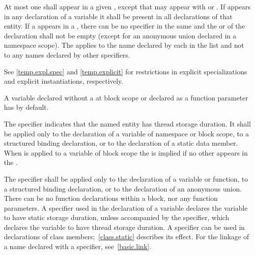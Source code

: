 At most one  shall appear in a given
, except that  may appear with  or
. If  appears in any declaration of
a variable it shall be present in all declarations of that entity. If a
appears in a , there can be no
 specifier in the same  and
the  or 
of the declaration shall not be
empty (except for an anonymous union declared in a namespace scope). The
 applies to the name declared by each
 in the list and not to any names declared by
other specifiers.
\begin{note}
See \ref{temp.expl.spec} and \ref{temp.explicit} for restrictions
in explicit specializations and explicit instantiations, respectively.
\end{note}

\pnum
\begin{note}
A variable declared without a 
at block scope or declared as a function parameter
has  by default.
\end{note}

\pnum
The  specifier
indicates that the named entity has thread storage duration. It
shall be applied only
to the declaration of a variable of namespace or block scope,
to a structured binding declaration, or
to the declaration of a static data member.
When  is applied to a variable of block scope the
  is implied if no other
 appears in the
.

\pnum
{}%
The  specifier shall be applied only
to the declaration of a variable or function,
to a structured binding declaration, or
to the declaration of an anonymous union.
There can be no
 function declarations within a block, nor any
 function parameters. A  specifier used in
the declaration of a variable declares the variable to have static storage
duration, unless accompanied by the
 specifier, which declares the variable to have thread
storage duration. A  specifier can be
used in declarations of class members;~\ref{class.static} describes its
effect.
%
For the linkage of a name declared with a  specifier,
see~\ref{basic.link}.

